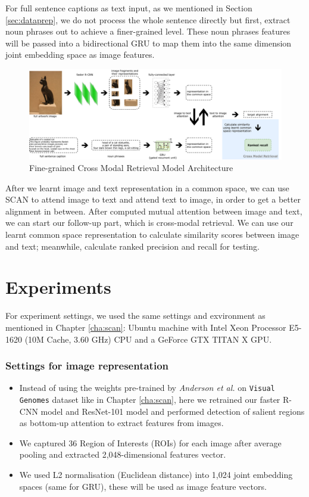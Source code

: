 For full sentence captions as text input, as we mentioned in Section \ref{sec:dataprep}, we do not process the whole sentence directly but first, extract noun phrases out to achieve a finer-grained level. These noun phrases features will be passed into a bidirectional GRU to map them into the same dimension joint embedding space as image features. 

\begin{figure}[h!]
\centering
\includegraphics[width=1.0\textwidth]{archi.pdf}
\caption{Fine-grained Cross Modal Retrieval Model Architecture}
\label{fig:mainarch}
\end{figure}

After we learnt image and text representation in a common space, we can use SCAN to attend image to text and attend text to image, in order to get a better alignment in between. After computed mutual attention between image and text, we can start our follow-up part, which is cross-modal retrieval. We can use our learnt common space representation to calculate similarity scores between image and text; meanwhile, calculate ranked precision and recall for testing.

\section{Experiments}

For experiment settings, we used the same settings and exvironment as mentioned in Chapter \ref{cha:scan}: Ubuntu machine with Intel Xeon Processor E5-1620 (10M Cache, 3.60 GHz) CPU and a GeForce GTX TITAN X GPU. 

\subsubsection{Settings for image representation}

\begin{itemize}
    \item Instead of using the weights pre-trained by \textit{Anderson et al.} on \verb|Visual Genomes| dataset like in Chapter \ref{cha:scan}, here we retrained our faster R-CNN model and ResNet-101 model and performed detection of salient regions as bottom-up attention to extract features from images. 
    \item We captured 36 Region of Interests (ROIs) for each image after average pooling and extracted 2,048-dimensional features vector.
    \item We used L2 normalisation (Euclidean distance) into 1,024 joint embedding spaces (same for GRU), these will be used as image feature vectors.
\end{itemize}

